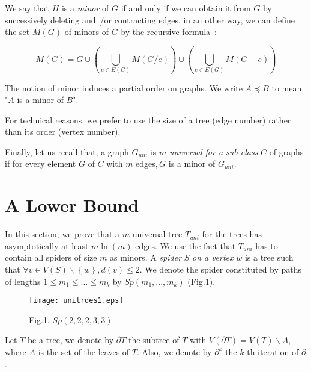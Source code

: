 \documentclass{llncs}
\begin{document}
We say that $H$ is a \textit{minor} of $G$ if and only if we can
obtain it from $G$ by successively deleting and~/or contracting
edges, in an other way, we can define the set $M(G)$ of minors of
$G$ by the recursive formula~:


\[
M\left( G \right) = G \cup \left( {\bigcup\limits_{e \in E\left( G \right)}
{M\left( {G / e} \right)} } \right) \cup \left( {\bigcup\limits_{e \in
E\left( G \right)} {M\left( {G - e} \right)} } \right)
\]





The notion of minor induces a partial order on graphs. We write
$A\preceq B$ to mean "$A$ is a minor of $B$".





For technical reasons, we prefer to use the size of a tree (edge number)
rather than its order (vertex number).

Finally, let us recall that, a graph $G_{uni} $ is $m$-\textit{universal} \textit{for a sub-class }$C$ of graphs if for
every element $G$ of $C$ with $m$ edges$, G$ is a minor of $G_{uni} $.





\section{A Lower Bound}





In this section, we prove that a $m$-universal tree $T_{uni} $ for
the trees has asymptotically at least $m\ln (m)$ edges. We use the
fact that $T_{uni} $ has to contain all spiders of size $m$ as
minors. A \textit{spider }$S$\textit{ on a vertex }$w$ is a tree
such that $\forall v \in V\left( S \right)\backslash \left\{ w
\right\}, d(v) \le 2$. We denote the spider constituted by paths
of lengths $1 \le m_1 \le ... \le m_k $ by $Sp(m_1 ,...,m_k )$
(Fig.1).


\begin{figure}[htbp]
\centerline{\texttt{[image: unitrdes1.eps]}}
\label{fig1}
\begin{center}
Fig.1. $Sp(2,2,2,3,3)$
\end{center}
\end{figure}


\begin{definition} Let $T$ be a tree, we denote by $\partial
T$ the subtree of $T$ with $V(\partial T) = V(T)\backslash A$,
where $A$ is the set of the leaves of $T$. Also, we denote by
$\partial ^k$ the $k$-th iteration of $\partial $.
\end{definition}
\end{document}

